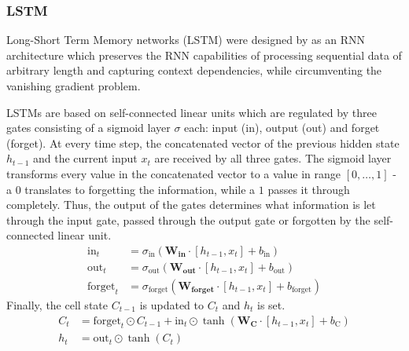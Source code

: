 \subsubsection{LSTM}\label{LSTM}
Long-Short Term Memory networks (LSTM) were designed by \cite{Hochreiter1997} as an RNN architecture which preserves the RNN capabilities of processing sequential data of arbitrary length and capturing context dependencies, while circumventing the vanishing gradient problem.

LSTMs are based on self-connected linear units which are regulated by three gates consisting of a sigmoid layer $\sigma$ each: input (in), output (out) and forget (forget). At every time step, the concatenated vector of the previous hidden state $h_{t-1}$ and the current input $x_{t}$ are received by all three gates. The sigmoid layer transforms every value in the concatenated vector to a value in range $[0, \dots, 1]$ - a $0$ translates to forgetting the information, while a $1$ passes it through completely. Thus, the output of the gates determines what information is let through the input gate, passed through the output gate or forgotten by the self-connected linear unit.
\begin{align*}
\text{in}_{t} &= \sigma_{\text{in}} (\boldsymbol{W_{\text{in}}} \cdot [h_{t-1},x_{t}] + b_{\text{in}}) \\
\text{out}_{t} &= \sigma_{\text{out}} (\boldsymbol{W_{\text{out}}} \cdot [h_{t-1},x_{t}] + b_{\text{out}}) \\
\text{forget}_{t} &= \sigma_{\text{forget}} (\boldsymbol{W_{\text{forget}}} \cdot [h_{t-1},x_{t}] + b_{\text{forget}})
\end{align*}
Finally, the cell state $C_{t-1}$ is updated to $C_{t}$ and $h_{t}$ is set.
\begin{align*}
C_{t} &= \text{forget}_{t} \odot C_{t-1} + \text{in}_{t} \odot \tanh (\boldsymbol{W_{C}} \cdot [h_{t-1},x_{t}] + b_{\text{C}}) \\
h_{t} &= \text{out}_{t} \odot \tanh (C_{t})
\end{align*}
